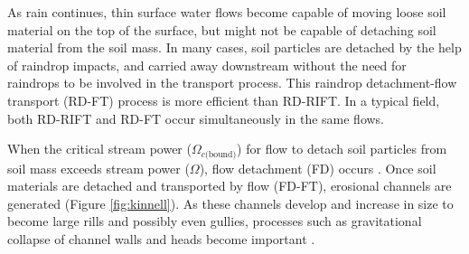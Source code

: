 As rain continues, thin surface water flows become capable of moving loose soil
material on the top of the surface, but might not be capable of detaching soil
material from the soil mass. In many cases, soil particles are detached by the
help of raindrop impacts, and carried away downstream without the need for
raindrops to be involved in the transport process. This raindrop detachment-flow
transport (RD-FT) process is more efficient than RD-RIFT. In a typical field,
both RD-RIFT and RD-FT occur simultaneously in the same flows.

When the critical stream power ($\Omega_{c\textrm{(bound)}}$) for flow to detach
soil particles from soil mass exceeds stream power ($\Omega$), flow detachment
(FD) occurs \citep{kinnell2000-discourse}. Once soil materials are detached and
transported by flow (FD-FT), erosional channels are generated (Figure
\ref{fig:kinnell}). As these channels develop and increase in size to become
large rills and possibly even gullies, processes such as gravitational collapse
of channel walls and heads become important \citep{boardman2003-165}.

